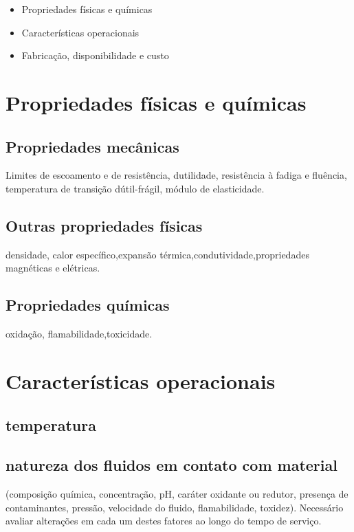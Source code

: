 \begin{itemize}
	\setlength{\parskip}{0pt}
	\setlength{\itemsep}{0pt plus 1pt}
	
	\item Propriedades físicas e químicas 
	\item Características operacionais
	\item Fabricação, disponibilidade e custo
	
\end{itemize}


\section{Propriedades físicas e químicas}

\subsection*{Propriedades mecânicas}
Limites de escoamento e de resistência, dutilidade, resistência à fadiga e fluência, temperatura de transição dútil-frágil, módulo de elasticidade.

\subsection{Outras propriedades físicas}
densidade, calor específico,expansão térmica,condutividade,propriedades magnéticas e elétricas.


\subsection*{Propriedades químicas}
oxidação, flamabilidade,toxicidade.

\section{Características operacionais}

\subsection*{temperatura}

\subsection*{natureza dos fluidos em contato com material}

(composição química, concentração, pH, caráter oxidante ou redutor, presença de contaminantes, pressão, velocidade do fluido, flamabilidade, toxidez). Necessário avaliar alterações em cada um destes fatores ao longo do tempo de serviço.

